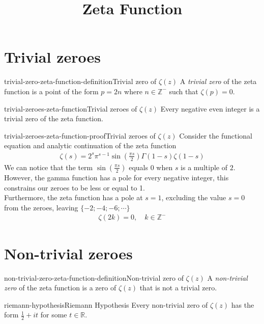 \documentclass[preview]{standalone}
\begin{document}
\title{Zeta Function}
\genpage

\section{Trivial zeroes}

\begin{snippetdefinition}{trivial-zero-zeta-function-definition}{Trivial zero of \(\zeta(z)\)}
    A \textit{trivial zero} of the zeta function is a point of the form \(p = 2n\)
    where \(n \in \mathbb{Z}^-\) such that \(\zeta(p)=0\).
\end{snippetdefinition}

\begin{snippetproposition}{trivial-zeroes-zeta-function}{Trivial zeroes of \(\zeta(z)\)}
    Every negative even integer is a trivial zero of the zeta function.
\end{snippetproposition}

\begin{snippetproof}{trivial-zeroes-zeta-function-proof}{Trivial zeroes of \(\zeta(z)\)}
    Consider the functional equation and analytic continuation of the zeta function
    \begin{align*}
        \zeta(s)=2^s\pi^{s-1}\sin\left(\frac{\pi s}{2}\right)\Gamma(1-s)\zeta(1-s)
    \end{align*}
    We can notice that the term \(\sin\left(\frac{\pi s}{2}\right)\) equals \(0\) when \(s\) is a multiple of \(2\).
    \\
    However, the gamma function has a pole for every negative integer, this constrains our zeroes to be less or equal to 1.\\
    Furthermore, the zeta function has a pole at \(s=1\), excluding the value \(s=0\) from the zeroes, leaving \(\{-2;-4;-6;\cdots\}\)
    \begin{align*}
        \zeta(2k)=0,
        \quad k\in \mathbb{Z}^{-}
    \end{align*}
\end{snippetproof}

\section{Non-trivial zeroes}

\begin{snippetdefinition}{non-trivial-zero-zeta-function-definition}{Non-trivial zero of \(\zeta(z)\)}
    A \textit{non-trivial zero} of the zeta function is a zero of \(\zeta(z)\)
    that is not a trivial zero.
\end{snippetdefinition}

\begin{snippetproposition}{riemann-hypothesis}{Riemann Hypothesis}
    Every non-trivial zero of \(\zeta(z)\) has the form \(\frac{1}{2} + it\)
    for some \(t \in \mathbb{R}\).
\end{snippetproposition}

\end{document}
